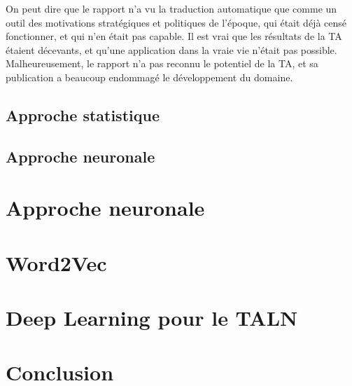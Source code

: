 \documentclass[11pt,a4paper]{report}
\begin{document}
  On peut dire que le rapport n'a vu la traduction automatique que comme un outil des 
  motivations stratégiques et politiques de l'époque, qui était 
  déjà censé fonctionner, et qui n'en était pas capable. Il est vrai que les résultats 
  de la TA étaient décevants, et qu'une application dans la vraie vie n'était pas possible. 
  Malheureusement, le rapport n'a pas reconnu le potentiel de la TA, et sa publication 
  a beaucoup endommagé le développement du domaine.   

  \section*{Approche statistique}
  \section*{Approche neuronale}

\chapter{Approche neuronale}
\chapter{Word2Vec}
\chapter{Deep Learning pour le TALN}
\chapter{Conclusion}



\end{document}
